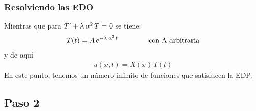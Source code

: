 \documentclass[12pt]{beamer}
\begin{document}
\begin{frame}
\frametitle{Resolviendo las EDO}
Mientras que para ${T}^{\prime} + \lambda \, \alpha^{2} \, T = 0$ se tiene:
\pause
\begin{align}
T(t) = A \, e^{- \lambda \, \alpha^{2} \, t} \hspace{1.5cm} \mbox{con A arbitraria}
\label{eq:ecuacion_06_02_36a}    
\end{align}
y de aquí
\begin{align*}
u(x, t) = X(x) \, T(t) 
\end{align*}
\pause
En este punto, tenemos un número infinito de funciones que satisfacen la EDP.
\end{frame}

\subsection{Paso 2}
\end{document}
